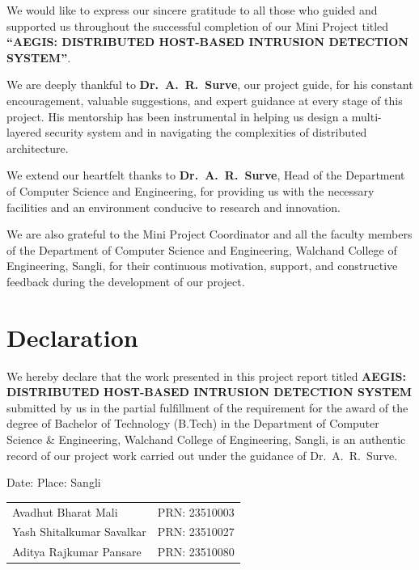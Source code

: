 \documentclass[12pt,a4paper]{report}
\begin{document}
We would like to express our sincere gratitude to all those who guided and supported us throughout the successful completion of our Mini Project titled \textbf{``AEGIS: DISTRIBUTED HOST-BASED INTRUSION DETECTION SYSTEM''}.

We are deeply thankful to \textbf{Dr.\ A.\ R.\ Surve}, our project guide, for his constant encouragement, valuable suggestions, and expert guidance at every stage of this project. His mentorship has been instrumental in helping us design a multi-layered security system and in navigating the complexities of distributed architecture.

We extend our heartfelt thanks to \textbf{Dr.\ A.\ R.\ Surve}, Head of the Department of Computer Science and Engineering, for providing us with the necessary facilities and an environment conducive to research and innovation.

We are also grateful to the Mini Project Coordinator and all the faculty members of the Department of Computer Science and Engineering, Walchand College of Engineering, Sangli, for their continuous motivation, support, and constructive feedback during the development of our project.

\chapter*{Declaration}

We hereby declare that the work presented in this project report titled \textbf{AEGIS: DISTRIBUTED HOST-BASED INTRUSION DETECTION SYSTEM} submitted by us in the partial fulfillment of the requirement for the award of the degree of Bachelor of Technology (B.Tech) in the Department of Computer Science \& Engineering, Walchand College of Engineering, Sangli, is an authentic record of our project work carried out under the guidance of Dr.\ A.\ R.\ Surve.

\vspace{20pt}

Date: \underline{\hspace{3cm}} \hfill Place: Sangli

\vspace{20pt}

\begin{tabular}{ll}
  Avadhut Bharat Mali       & PRN: 23510003 \\[10pt]
  Yash Shitalkumar Savalkar & PRN: 23510027 \\[10pt]
  Aditya Rajkumar Pansare   & PRN: 23510080 \\
\end{tabular}
\end{document}
